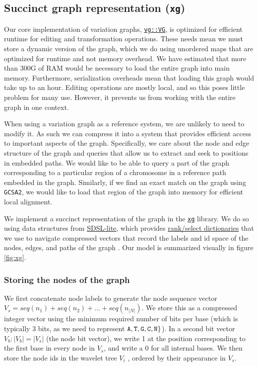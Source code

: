 \documentclass[12pt]{article}
\begin{document}
\subsection{Succinct graph representation ({\tt xg})}

Our core implementation of variation graphs, \href{https://github.com/vgteam/vg/blob/fbcb6e62/src/vg.hpp#L196-L1146}{{\tt vg::VG}}, is optimized for efficient runtime for editing and transformation operations.
These needs mean we must store a dynamic version of the graph, which we do using unordered maps that are optimized for runtime and not memory overhead.
We have estimated that more than 300G of RAM would be necessary to load the entire graph into main memory.
Furthermore, serialization overheads mean that loading this graph would take up to an hour.
Editing operations are mostly local, and so this poses little problem for many use.
However, it prevents us from working with the entire graph in one context.

When using a variation graph as a reference system, we are unlikely to need to modify it.
As such we can compress it into a system that provides efficient access to important aspects of the graph.
Specifically, we care about the node and edge structure of the graph and queries that allow us to extract and seek to positions in embedded paths.
We would like to be able to query a part of the graph corresponding to a particular region of a chromosome in a reference path embedded in the graph.
Similarly, if we find an exact match on the graph using {\tt GCSA2}, we would like to load that region of the graph into memory for efficient local alignment.

We implement a succinct representation of the graph in the \href{https://github.com/vgteam/xg}{{\tt xg}} library.
We do so using data structures from \href{https://github.com/simongog/sdsl-lite}{SDSL-lite}, which provides \href{https://en.wikipedia.org/wiki/Succinct_data_structure#Succinct_dictionaries}{rank/select dictionaries} that we use to navigate compressed vectors that record the labels and id space of the nodes, edges, and paths of the graph \cite{okanohara2007}.
Our model is summarized visually in figure \ref{fig:xg}.

\subsubsection{Storing the nodes of the graph}

We first concatenate node labels to generate the node sequence vector $V_s = seq(n_1) + seq(n_2) + \ldots + seq(n_{|N|})$.
We store this as a compressed integer vector using the minimum required number of bits per base (which is typically 3 bits, as we need to represent ${\tt A, T, G, C, N} \}$).
In a second bit vector $V_b : |V_b| = |V_s|$ (the node bit vector), we write 1 at the position corresponding to the first base in every node in $V_s$, and write a 0 for all internal bases.
We then store the node ids in the wavelet tree $V_i$ \cite{grossi2003high}, ordered by their appearance in $V_s$.
\end{document}
